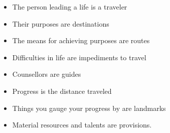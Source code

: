 \documentclass[headrule,footrule]{foils}
\begin{document}
\begin{itemize}
\item The person leading a life is a traveler
\item Their purposes are destinations
\item The means for achieving purposes are routes
\item Difficulties in life are impediments to travel
\item Counsellors are guides
\item Progress is the distance traveled
\item Things you gauge your progress by are landmarks
\item Material resources and talents are provisions.
\end{itemize}

\end{document}

